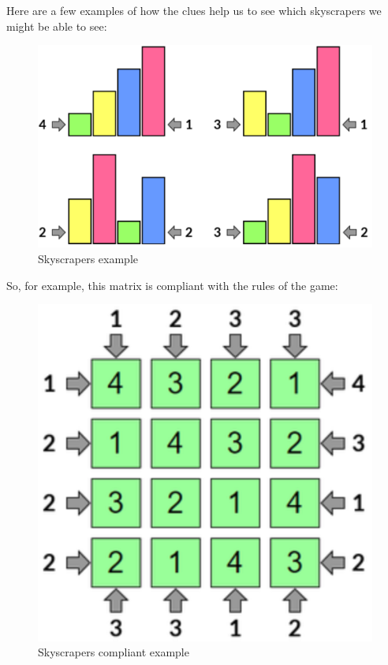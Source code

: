 \documentclass{article}
\begin{document}
Here are a few examples of how the clues help us to see which skyscrapers we might be able to see:\\

\begin{figure}[H]
  \centering
  \includegraphics[scale=0.6]{img/skyscrapers-example.png}
  \caption{Skyscrapers example}
\end{figure}

\pagebreak

So, for example, this matrix is compliant with the rules of the game:\\

\begin{figure}[H]
  \centering
  \includegraphics[scale=0.6]{img/skyscrapers-compliant.png}
  \caption{Skyscrapers compliant example}
\end{figure}
\end{document}
